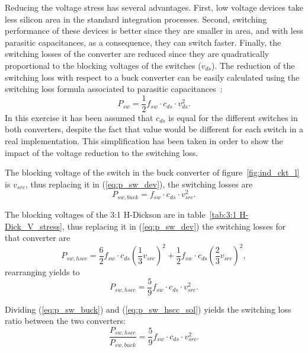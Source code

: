 Reducing the voltage stress has several advantages. First, low voltage devices take less silicon area in the standard integration processes. Second, switching performance of these devices is better since they are smaller in area, and with less parasitic capacitances, as a consequence, they can switch faster. Finally, the switching losses of the converter are reduced since they are quadratically proportional to the blocking voltages of the switches ($v_{ds}$). The reduction of the switching loss with respect to a buck converter can be easily calculated using the switching loss formula associated to parasitic  capacitances~\cite{2001fundamentals_erickson}:
\begin{equation}
P_{sw} = \frac{1}{2} f_{sw} \cdot c_{ds} \cdot v_{ds}^2.
\label{eq:p_sw_dev}
\end{equation}
In this exercise it has been assumed that $c_{ds}$ is equal for the different switches in both converters, despite the fact that value would be different for each switch in a real implementation. This simplification has been taken in order to show the impact of the voltage reduction to the switching loss. %

The blocking voltage of the switch in the buck converter of figure~\ref{fig:ind_ckt_l} is $v_{src}$, thus replacing it in (\ref{eq:p_sw_dev}), the switching losses are
\begin{equation}
P_{sw,buck} =   f_{sw} \cdot c_{ds} \cdot v_{src}^2.
\label{eq:p_sw_buck}
\end{equation}

The blocking voltages of the 3:1 H-Dickson are in table~\ref{tab:3:1 H-Dick_V_stress}, thus replacing it in (\ref{eq:p_sw_dev}) the switching losses for that converter are
\begin{equation}
P_{sw,hscc} =  \frac{6}{2}  f_{sw} \cdot c_{ds} \left( \frac{1}{3} v_{src} \right)^2 + \frac{1}{2}  f_{sw} \cdot c_{ds} \left( \frac{2}{3} v_{src} \right)^2 ,
\label{eq:p_sw_hscc}
\end{equation}
rearranging yields to
\begin{equation}
P_{sw,hscc} =  \frac{5}{9}  f_{sw} \cdot c_{ds} \cdot v_{src}^2.
\label{eq:p_sw_hscc_sol}
\end{equation}

Dividing (\ref{eq:p_sw_buck}) and (\ref{eq:p_sw_hscc_sol}) yields the switching loss ratio between the two converters:
\begin{equation}
\frac{P_{sw,hscc}}{P_{sw,buck}} =  \frac{5}{9}  f_{sw} \cdot c_{ds} \cdot v_{src}^2.
\label{eq:p_sw_hscc_sol}
\end{equation}

